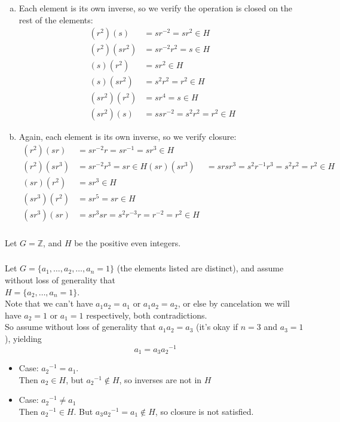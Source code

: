 \documentclass{article}
\newcommand{\ints}{\mathbb{Z}}
\newcommand{\set}[1]{ \{ #1 \} }
\newcommand{\inv}[1]{ {#1}^{-1} }
\begin{document}
\subsubsection{}\label{ex1p3}
\begin{enumerate}[(a)]
\item Each element is its own inverse, so we verify the operation is closed on the rest of the elements:
\begin{align*}
(r^2)(s) &= sr^{-2} = sr^2 \in H\\
(r^2)(sr^2) &= sr^{-2}r^2 = s \in H\\
(s)(r^2) &= sr^2 \in H\\
(s)(sr^2) &= s^2r^2 = r^2 \in H\\
(sr^2)(r^2) &= sr^4 = s \in H\\
(sr^2)(s) &= ssr^{-2} =s^2r^2 = r^2 \in H
\end{align*}
\item Again, each element is its own inverse, so we verify closure:
\begin{align*}
(r^2)(sr) &= sr^{-2}r = s\inv{r} = sr^3 \in H\\
(r^2)(sr^3) &= sr^{-2}r^3 = sr \in H
(sr)(sr^3) &= srsr^3 = s^2\inv{r}r^3 = s^2r^2 = r^2 \in H\\
(sr)(r^2) &= sr^3 \in H\\
(sr^3)(r^2) &= sr^5 = sr \in H\\
(sr^3)(sr) &= sr^3sr = s^2r^{-3}r = r^{-2} = r^2 \in H
\end{align*}
\end{enumerate}

\subsubsection{}\label{ex1p4}
Let $G=\ints$, and $H$ be the positive even integers.

\subsubsection{}\label{ex1p5}
Let $G=\set{a_1,\ldots,a_2,\ldots,a_n=1}$ (the elements listed are distinct), and assume without loss of generality that\\
$H = \set{a_2,\ldots,a_n=1}$.\\
Note that we can't have $a_1a_2=a_1$ or $a_1a_2=a_2$, or else by cancelation we will have $a_2=1$ or $a_1=1$ respectively, both contradictions.\\
So assume without loss of generality that $a_1a_2=a_3$ 
(it's okay if $n=3$ and $a_3=1$), yielding
\begin{equation}
a_1 = a_3\inv{a_2}
\end{equation}
\begin{itemize}
\item Case: $\inv{a_2} = a_1$.\\
Then $a_2\in H$, but $\inv{a_2} \notin H$, so inverses are not in $H$
\item Case: $\inv{a_2} \neq a_1$\\
Then $\inv{a_2} \in H$. But $a_3\inv{a_2} = a_1 \notin H$, so closure is not satisfied.
\end{itemize}
\end{document}
